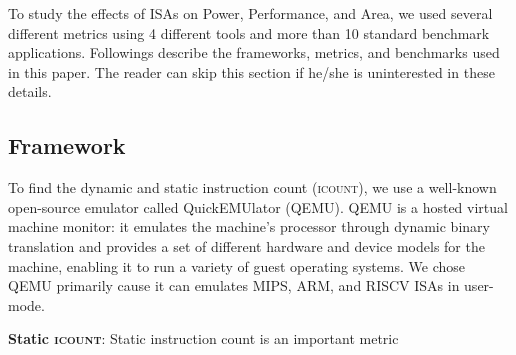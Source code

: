 \newcommand{\icount}{\textsc{icount}\xspace}

To study the effects of ISAs on Power, Performance, and Area, we used several different metrics using 4 different tools and more than 10 standard benchmark applications. Followings describe the frameworks, metrics, and benchmarks used in this paper. The reader can skip this section if he/she is uninterested in these details. 

\subsection{Framework} 
To find the dynamic and static instruction count (\icount), we use a well-known open-source emulator called QuickEMUlator (QEMU). QEMU is a hosted virtual machine monitor: it emulates the machine's processor through dynamic binary translation and provides a set of different hardware and device models for the machine, enabling it to run a variety of guest operating systems. We chose QEMU primarily cause it can emulates MIPS, ARM, and RISCV ISAs in user-mode. 

\noindent \textbf{Static \icount}: Static instruction count is an important metric 

